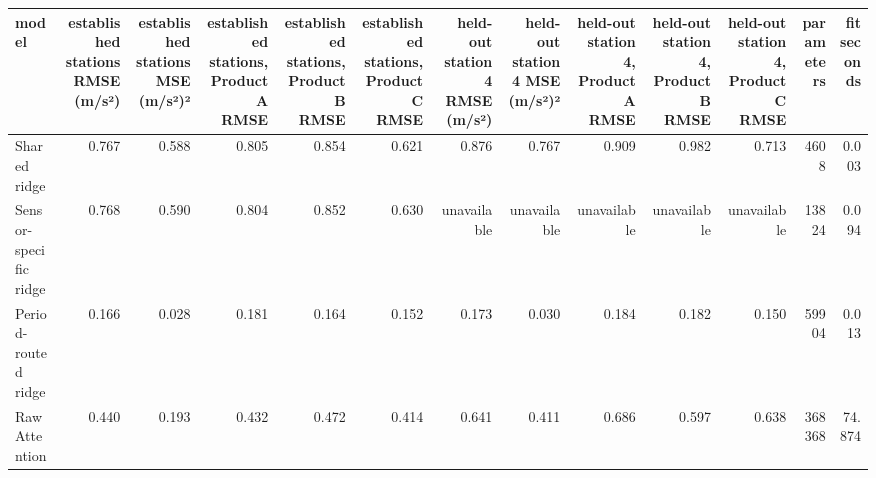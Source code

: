\begin{tabular}{lrrrrrrrrrrrr}
\toprule
model & established stations RMSE (m/s²) & established stations MSE (m/s²)² & established stations, Product A RMSE & established stations, Product B RMSE & established stations, Product C RMSE & held-out station 4 RMSE (m/s²) & held-out station 4 MSE (m/s²)² & held-out station 4, Product A RMSE & held-out station 4, Product B RMSE & held-out station 4, Product C RMSE & parameters & fit seconds \\
\midrule
Shared ridge & 0.767 & 0.588 & 0.805 & 0.854 & 0.621 & 0.876 & 0.767 & 0.909 & 0.982 & 0.713 & 4608 & 0.003 \\
Sensor-specific ridge & 0.768 & 0.590 & 0.804 & 0.852 & 0.630 & unavailable & unavailable & unavailable & unavailable & unavailable & 13824 & 0.094 \\
Period-routed ridge & 0.166 & 0.028 & 0.181 & 0.164 & 0.152 & 0.173 & 0.030 & 0.184 & 0.182 & 0.150 & 59904 & 0.013 \\
Raw Attention & 0.440 & 0.193 & 0.432 & 0.472 & 0.414 & 0.641 & 0.411 & 0.686 & 0.597 & 0.638 & 368368 & 74.874 \\
\bottomrule
\end{tabular}
